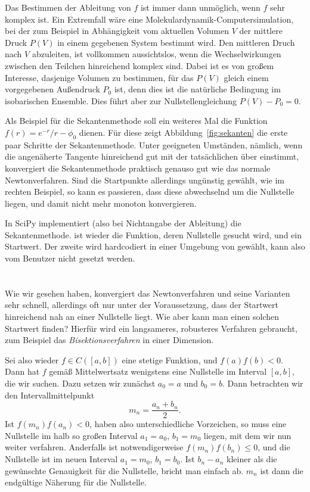 Das Bestimmen der Ableitung von $f$ ist immer dann unmöglich, wenn $f$
sehr komplex ist. Ein Extremfall wäre eine
Molekulardynamik-Computersimulation, bei der zum Beispiel in
Abhängigkeit vom aktuellen Volumen $V$ der mittlere Druck $P(V)$ in
einem gegebenen System bestimmt wird. Den mittleren Druch nach $V$
abzuleiten, ist vollkommen aussichtslos, wenn die Wechselwirkungen
zwischen den Teilchen hinreichend komplex sind. Dabei ist es von
großem Interesse, dasjenige Volumen zu bestimmen, für das $P(V)$
gleich einem vorgegebenen Außendruck $P_0$ ist, denn dies ist die
natürliche Bedingung im isobarischen Ensemble. Dies führt aber zur
Nullstellengleichung $P(V)-P_0 = 0$.

Als Beispiel für die Sekantenmethode soll ein weiteres Mal die
Funktion $f(r) = e^{-r}/r - \phi_0$ dienen. Für diese zeigt
Abbildung~\ref{fig:sekanten} die erste paar Schritte der
Sekantenmethode. Unter geeigneten Umständen, nämlich, wenn die
angenäherte Tangente hinreichend gut mit der tatsächlichen über
einstimmt, konvergiert die Sekantenmethode praktisch genauso gut wie
das normale Newtonverfahren. Sind die Startpunkte allerdings ungünstig
gewählt, wie im rechten Beispiel, so kann es passieren, dass diese
abwechselnd um die Nullstelle liegen, und damit nicht mehr monoton
konvergieren.

In SciPy implementiert  (also bei
Nichtangabe der Ableitung) die Sekantenmethode.  ist wieder
die Funktion, deren Nullstelle gesucht wird, und  ein
Startwert. Der zweite wird hardcodiert in einer Umgebung von 
gewählt, kann also vom Benutzer nicht gesetzt werden.

\section{}

Wie wir gesehen haben, konvergiert das Newtonverfahren und seine
Varianten sehr schnell, allerdings oft nur unter der Voraussetzung,
dass der Startwert hinreichend nah an einer Nullstelle liegt. Wie aber
kann man einen solchen Startwert finden? Hierfür wird ein langsameres,
robusteres Verfahren gebraucht, zum Beispiel das
\emph{Bisektionsverfahren} in einer Dimension.

Sei also wieder $f\in C([a,b])$ eine stetige Funktion, und
$f(a)f(b)<0$. Dann hat $f$ gemäß Mittelwertsatz wenigstens eine
Nullstelle im Interval $[a,b]$, die wir suchen. Dazu setzen wir
zunächst $a_0=a$ und $b_0=b$. Dann betrachten wir den
Intervallmittelpunkt
\begin{equation}
  m_{n} = \frac{a_n + b_n}{2}.
\end{equation}
Ist $f(m_n)f(a_n) < 0$, haben also unterschiedliche Vorzeichen, so
muss eine Nullstelle im halb so großen Interval $a_1=a_0$, $b_1=m_0$
liegen, mit dem wir nun weiter verfahren. Anderfalls ist
notwendigerweise $f(m_n)f(b_n)\le 0$, und die Nullstelle ist im neuen
Interval $a_1=m_0$, $b_1 = b_0$. Ist $b_n - a_n$ kleiner als die
gewünschte Genauigkeit für die Nullstelle, bricht man einfach
ab. $m_n$ ist dann die endgültige Näherung für die Nullstelle.

